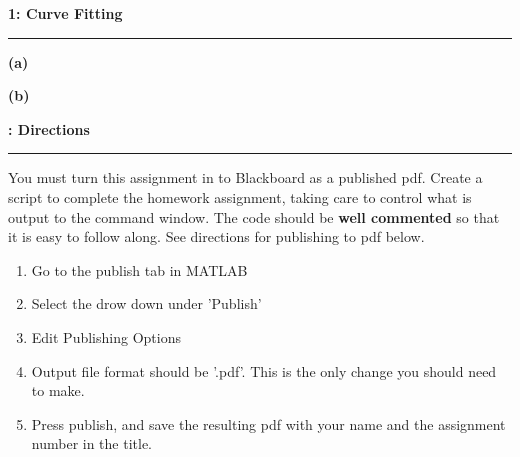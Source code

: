 \documentclass[11pt]{article}
\newcommand\question[2]{\vspace{.25in}\textbf{#1: #2}\vspace{.5em}\hrule\vspace{.10in}}
\renewcommand\part[1]{\vspace{.10in}\textbf{(#1)}}
\begin{document}
\raggedright
\newcommand\NAME{Carl Kingsford}  %
\newcommand\ANDREWID{ckingsf}     %
\newcommand\HWNUM{1}              %


\question{1}{Curve Fitting} 

\part{a} 

\part{b}

\question{}{Directions}
You must turn this assignment in to Blackboard as a published pdf. Create a script to complete the homework assignment, taking care to control what is output to the command window. The code should be \textbf{well commented} so that it is easy to follow along. See directions for publishing to pdf below. 

\begin{enumerate}
\item Go to the publish tab in MATLAB
\item Select the drow down under 'Publish'
\item Edit Publishing Options
\item Output file format should be '.pdf'. This is the only change you should need to make.
\item Press publish, and save the resulting pdf with your name and the assignment number in the title.
\end{enumerate}
\end{document}
